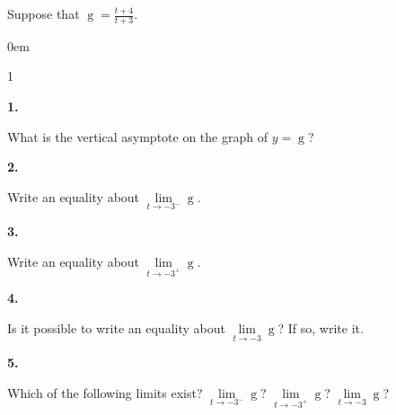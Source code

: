 \documentclass[12pt,]{book}
\theoremstyle{plain}
\theoremstyle{definition}
\numberwithin{equation}{section}
\newenvironment{exercisegroup}%
{\medskip\noindent}%
{\par\bigskip}%
\newlength{\exercisegroupindent}%
\newlength{\exercisegroupitemwidth}%
\newenvironment{exercisegrouplist}%
{\vspace{-\partopsep}%
\begin{adjustwidth}{\exercisegroupindent}{0em}}%
{\end{adjustwidth}%
\vspace{-\partopsep}%
\vspace{\baselineskip}}%
\newenvironment{exercisegroupbycol}[1]%
{\begin{exercisegrouplist}%
\vspace{-\multicolsep}%
\begin{multicols}{#1}%
\setlength{\parindent}{0em}%
\setlength{\exercisegroupitemwidth}{\linewidth}}%
{\end{multicols}%
\vspace{-\multicolsep}%
\end{exercisegrouplist}}%
\newenvironment{exercisegroupitem}[1]%
{\begin{minipage}[t]{\exercisegroupitemwidth}
\vspace{0pt}%
{\bfseries#1}%
\rule{0pt}{\baselineskip}}{\strut%
\end{minipage}%
\hspace{\columnsep}}%
\providecommand\phantomsection{}
\newcommand{\fe}[2]{\mathop{{#1}{\left(#2\right)}}}
\begin{document}
\begin{exercisegroup}%
Suppose that \(\fe{g}{t}=\frac{t+4}{t+3}\).%
\par
\begin{exercisegroupbycol}{1}%
\begin{exercisegroupitem}{1. }\phantomsection\hypertarget{exercise-90}{\null}
What is the vertical asymptote on the graph of \(y=\fe{g}{t}\)?%
\end{exercisegroupitem}%
\par%
\begin{exercisegroupitem}{2. }\phantomsection\hypertarget{exercise-91}{\null}
Write an equality about \(\lim\limits_{t\to-3^{-}}\fe{g}{t}\).%
\end{exercisegroupitem}%
\par%
\begin{exercisegroupitem}{3. }\phantomsection\hypertarget{exercise-92}{\null}
Write an equality about \(\lim\limits_{t\to-3^{+}}\fe{g}{t}\).%
\end{exercisegroupitem}%
\par%
\begin{exercisegroupitem}{4. }\phantomsection\hypertarget{exercise-93}{\null}
Is it possible to write an equality about \(\lim\limits_{t\to-3}\fe{g}{t}\)? If so, write it.%
\end{exercisegroupitem}%
\par%
\begin{exercisegroupitem}{5. }\phantomsection\hypertarget{exercise-94}{\null}
Which of the following limits exist? \(\lim\limits_{t\to-3^{-}}\fe{g}{t}\)? \(\lim\limits_{t\to-3^{+}}\fe{g}{t}\)? \(\lim\limits_{t\to-3}\fe{g}{t}\)?%
\end{exercisegroupitem}%
\par%
\end{exercisegroupbycol}%
\end{exercisegroup}%
\end{document}
